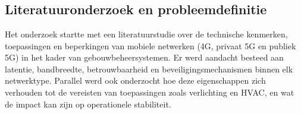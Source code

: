 
\chapter{}%
\label{ch:methodologie}

\chapter{}%
\label{ch:methodologie}

\section{Literatuuronderzoek en probleemdefinitie}

Het onderzoek startte met een literatuurstudie over de technische kenmerken, toepassingen en beperkingen van mobiele netwerken (4G, privaat 5G en publiek 5G) in het kader van gebouwbeheersystemen. Er werd aandacht besteed aan latentie, bandbreedte, betrouwbaarheid en beveiligingsmechanismen binnen elk netwerktype. Parallel werd ook onderzocht hoe deze eigenschappen zich verhouden tot de vereisten van toepassingen zoals verlichting en HVAC, en wat de impact kan zijn op operationele stabiliteit.

